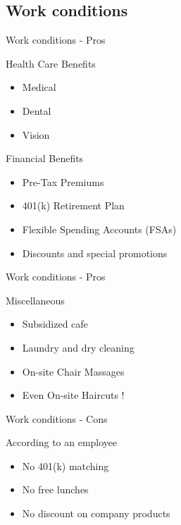 \documentclass{beamer}
\begin{document}
\subsection{Work conditions}
\begin{frame}{Work conditions - Pros}

	\begin{block}{Health Care Benefits}
		\begin{itemize}
			\item<+->{Medical}
			\item<+->{Dental}
			\item<+->{Vision}
		\end{itemize}
	\end{block}
	\begin{block}{Financial Benefits}
		\begin{itemize}
			\item<+->{Pre-Tax Premiums}
			\item<+->{401(k) Retirement Plan}
			\item<+->{Flexible Spending Accounts (FSAs)}
			\item<+->{Discounts and special promotions}
		\end{itemize}
	\end{block}
\end{frame}
\begin{frame}{Work conditions - Pros}
	\begin{block}{Miscellaneous}
		\begin{itemize}
			\item<+->{Subsidized cafe}
			\item<+->{Laundry and dry cleaning}
			\item<+->{On-site Chair Massages}
			\item<+->{Even On-site Haircuts !}
		\end{itemize}
	\end{block}
\end{frame}

\begin{frame}{Work conditions - Cons}
	\begin{block}{According to an employee}
		\begin{itemize}
			\item<+->{No 401(k) matching}
			\item<+->{No free lunches}
			\item<+->{No discount on company products}
		\end{itemize}
	\end{block}
\end{frame}
\end{document}
